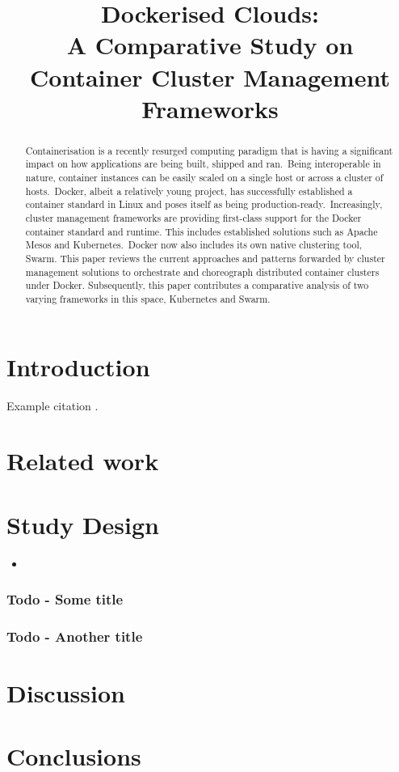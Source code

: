 \documentclass{article}
\title{Dockerised Clouds: \\ A Comparative Study on Container Cluster Management Frameworks}
\begin{document}
\maketitle

\begin{abstract}
Containerisation is a recently resurged computing paradigm 
that is having a significant impact on how applications are being built, 
shipped and ran.\ Being interoperable in nature, container instances can be easily scaled
on a single host or across a cluster of hosts.\
Docker, albeit a relatively young project, 
has successfully established a container standard  
in Linux and poses itself as being production-ready.\ 
Increasingly, cluster management frameworks are providing 
first-class support for the Docker container standard and runtime. 
This includes established solutions such as Apache Mesos 
and Kubernetes.\ Docker now also includes its own native clustering
 tool, Swarm.
This paper reviews the current approaches and patterns forwarded by 
cluster management solutions to orchestrate and choreograph 
distributed container clusters under Docker. Subsequently, this paper
contributes a comparative analysis of two varying 
frameworks in this space,  Kubernetes and Swarm.


\end{abstract}

\section{Introduction}
Example citation \citep{db}. \lipsum[1]


\section{Related work}
\lipsum[1]

\section{Study Design}
\lipsum[1]
\begin{itemize}
\item \lipsum[1]
\end{itemize}

\subsubsection{Todo - Some title}
\lipsum[1]

\subsubsection{Todo - Another title}
\lipsum[1]


\section{Discussion}
\lipsum[1]

\section{Conclusions}
\lipsum[1]


\vspace{-7.5mm}
\renewcommand{\refname}{\section{References}}

\end{document}

